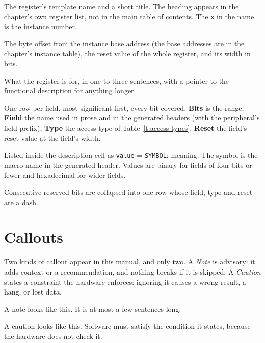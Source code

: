 \documentclass[11pt,pdftex,openany,letterpaper]{report}
\begin{document}
\begin{description}[style=nextline, leftmargin=0pt, itemsep=1pt]
	\item[Heading] The register's template name and a short title. The heading appears in the chapter's own register list, not in the main table of contents. The \texttt{x} in the name is the instance number.
	\item[Offset, Reset, Width] The byte offset from the instance base address (the base addresses are in the chapter's instance table), the reset value of the whole register, and its width in bits.
	\item[Summary sentence] What the register is for, in one to three sentences, with a pointer to the functional description for anything longer.
	\item[Field rows] One row per field, most significant first, every bit covered. \textbf{Bits} is the range, \textbf{Field} the name used in prose and in the generated headers (with the peripheral's field prefix), \textbf{Type} the access type of Table~\ref{t:access-types}, \textbf{Reset} the field's reset value at the field's width.
	\item[Enumerated values] Listed inside the description cell as \texttt{value} = \texttt{SYMBOL}: meaning. The symbol is the macro name in the generated header. Values are binary for fields of four bits or fewer and hexadecimal for wider fields.
	\item[Reserved runs] Consecutive reserved bits are collapsed into one row whose field, type and reset are a dash.
\end{description}

\section{Callouts} \label{ss:callouts}

Two kinds of callout appear in this manual, and only two. A \emph{Note} is advisory: it adds context or a recommendation, and nothing breaks if it is skipped. A \emph{Caution} states a constraint the hardware enforces: ignoring it causes a wrong result, a hang, or lost data.

\begin{Note}
A note looks like this. It is at most a few sentences long.
\end{Note}

\begin{Caution}
A caution looks like this. Software must satisfy the condition it states, because the hardware does not check it.
\end{Caution}
\end{document}
